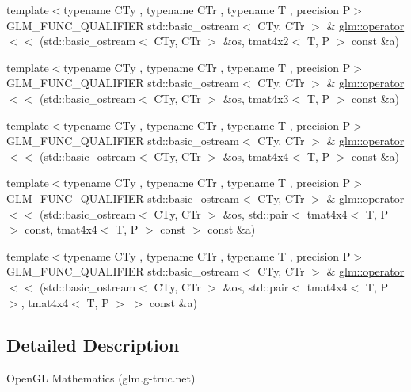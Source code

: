 \begin{DoxyCompactItemize}
\item 
{\footnotesize template$<$typename C\+Ty , typename C\+Tr , typename T , precision P$>$ }\\G\+L\+M\+\_\+\+F\+U\+N\+C\+\_\+\+Q\+U\+A\+L\+I\+F\+I\+E\+R std\+::basic\+\_\+ostream$<$ C\+Ty, C\+Tr $>$ \& \hyperlink{group__gtx__io_ga8ce3cf61260e62080a9596c2f10ab4a0}{glm\+::operator$<$$<$} (std\+::basic\+\_\+ostream$<$ C\+Ty, C\+Tr $>$ \&os, tmat4x2$<$ T, P $>$ const \&a)
\item 
{\footnotesize template$<$typename C\+Ty , typename C\+Tr , typename T , precision P$>$ }\\G\+L\+M\+\_\+\+F\+U\+N\+C\+\_\+\+Q\+U\+A\+L\+I\+F\+I\+E\+R std\+::basic\+\_\+ostream$<$ C\+Ty, C\+Tr $>$ \& \hyperlink{group__gtx__io_gaca75b14a0534a02860349a114a10aa44}{glm\+::operator$<$$<$} (std\+::basic\+\_\+ostream$<$ C\+Ty, C\+Tr $>$ \&os, tmat4x3$<$ T, P $>$ const \&a)
\item 
{\footnotesize template$<$typename C\+Ty , typename C\+Tr , typename T , precision P$>$ }\\G\+L\+M\+\_\+\+F\+U\+N\+C\+\_\+\+Q\+U\+A\+L\+I\+F\+I\+E\+R std\+::basic\+\_\+ostream$<$ C\+Ty, C\+Tr $>$ \& \hyperlink{group__gtx__io_ga6683acc91ba7ce5822e25a2517550bff}{glm\+::operator$<$$<$} (std\+::basic\+\_\+ostream$<$ C\+Ty, C\+Tr $>$ \&os, tmat4x4$<$ T, P $>$ const \&a)
\item 
{\footnotesize template$<$typename C\+Ty , typename C\+Tr , typename T , precision P$>$ }\\G\+L\+M\+\_\+\+F\+U\+N\+C\+\_\+\+Q\+U\+A\+L\+I\+F\+I\+E\+R std\+::basic\+\_\+ostream$<$ C\+Ty, C\+Tr $>$ \& \hyperlink{group__gtx__io_ga112ff562e10c18929151d17e711e27a7}{glm\+::operator$<$$<$} (std\+::basic\+\_\+ostream$<$ C\+Ty, C\+Tr $>$ \&os, std\+::pair$<$ tmat4x4$<$ T, P $>$ const, tmat4x4$<$ T, P $>$ const  $>$ const \&a)
\item 
{\footnotesize template$<$typename C\+Ty , typename C\+Tr , typename T , precision P$>$ }\\G\+L\+M\+\_\+\+F\+U\+N\+C\+\_\+\+Q\+U\+A\+L\+I\+F\+I\+E\+R std\+::basic\+\_\+ostream$<$ C\+Ty, C\+Tr $>$ \& \hyperlink{group__gtx__io_gad09c7114641975d778243bd4379a3ea5}{glm\+::operator$<$$<$} (std\+::basic\+\_\+ostream$<$ C\+Ty, C\+Tr $>$ \&os, std\+::pair$<$ tmat4x4$<$ T, P $>$, tmat4x4$<$ T, P $>$ $>$ const \&a)
\end{DoxyCompactItemize}


\subsection{Detailed Description}
Open\+G\+L Mathematics (glm.\+g-\/truc.\+net)

